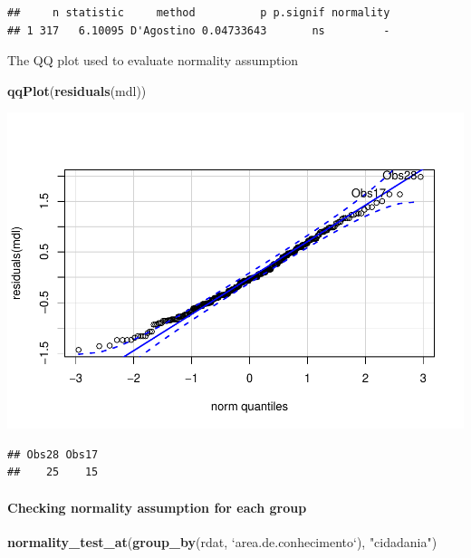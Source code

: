 \documentclass[]{article}
\newenvironment{Shaded}{\begin{snugshade}}{\end{snugshade}}
\newcommand{\DataTypeTok}[1]{\textcolor[rgb]{0.13,0.29,0.53}{#1}}
\newcommand{\KeywordTok}[1]{\textcolor[rgb]{0.13,0.29,0.53}{\textbf{#1}}}
\newcommand{\NormalTok}[1]{#1}
\newcommand{\StringTok}[1]{\textcolor[rgb]{0.31,0.60,0.02}{#1}}
\let\oldparagraph\paragraph
\renewcommand{\paragraph}[1]{\oldparagraph{#1}\mbox{}}
\begin{document}
\begin{verbatim}
##     n statistic     method          p p.signif normality
## 1 317   6.10095 D'Agostino 0.04733643       ns         -
\end{verbatim}

The QQ plot used to evaluate normality assumption

\begin{Shaded}
\begin{Highlighting}[]
\KeywordTok{qqPlot}\NormalTok{(}\KeywordTok{residuals}\NormalTok{(mdl))}
\end{Highlighting}
\end{Shaded}

\includegraphics{factorialAnova_files/figure-latex/unnamed-chunk-7-1.pdf}

\begin{verbatim}
## Obs28 Obs17 
##    25    15
\end{verbatim}

\hypertarget{checking-normality-assumption-for-each-group}{%
\paragraph{Checking normality assumption for each
group}\label{checking-normality-assumption-for-each-group}}

\begin{Shaded}
\begin{Highlighting}[]
\KeywordTok{normality_test_at}\NormalTok{(}\KeywordTok{group_by}\NormalTok{(rdat, }\StringTok{`}\DataTypeTok{area.de.conhecimento}\StringTok{`}\NormalTok{), }\StringTok{"cidadania"}\NormalTok{)}
\end{Highlighting}
\end{Shaded}
\end{document}
